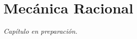 \documentclass[../apunte_mecanica_clasica.tex]{subfiles}%
\begin{document}
\chapter{Mecánica Racional}


\begin{center}
\vspace{1cm}
\textit{Capítulo en preparación.}
\end{center}
\end{document}
